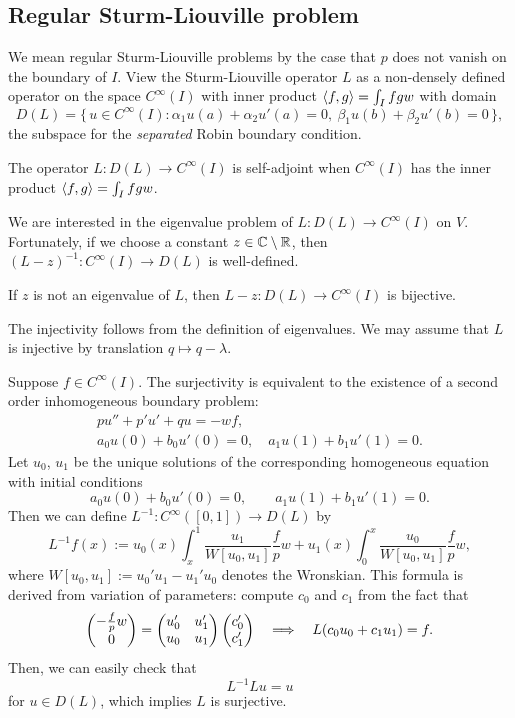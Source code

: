 \documentclass[11pt]{article}
\begin{document}
\subsection{Regular Sturm-Liouville problem}
We mean regular Sturm-Liouville problems by the case that $p$ does not vanish on the boundary of $I$.
View the Sturm-Liouville operator $L$ as a non-densely defined operator on the space $C^\infty(I)$ with inner product $\langle f,g\rangle=\int_Ifgw$ with domain
\[D(L)=\{\,u\in C^\infty(I):\alpha_1u(a)+\alpha_2u'(a)=0,\ \beta_1u(b)+\beta_2u'(b)=0\,\},\]
the subspace for the \emph{separated} Robin boundary condition.
\begin{prop}
The operator $L:D(L)\to C^\infty(I)$ is self-adjoint when $C^\infty(I)$ has the inner product $\langle f,g\rangle=\int_Ifgw$.
\end{prop}
We are interested in the eigenvalue problem of $L:D(L)\to C^\infty(I)$ on $V$.
Fortunately, if we choose a constant $z\in\mathbb{C}\setminus\mathbb{R}$, then $(L-z)^{-1}:C^\infty(I)\to D(L)$ is well-defined.
\begin{prop}
If $z$ is not an eigenvalue of $L$, then $L-z: D(L)\to C^\infty(I)$ is bijective.
\end{prop}
\begin{pf}
The injectivity follows from the definition of eigenvalues.
We may assume that $L$ is injective by translation $q\mapsto q-\lambda$.

Suppose $f\in C^\infty(I)$.
The surjectivity is equivalent to the existence of a second order inhomogeneous boundary problem:
\begin{gather*}
pu''+p'u'+qu=-wf,\\
a_0u(0)+b_0u'(0)=0,\quad a_1u(1)+b_1u'(1)=0.
\end{gather*}
Let $u_0$, $u_1$ be the unique solutions of the corresponding homogeneous equation with initial conditions
\[a_0u(0)+b_0u'(0)=0,\qquad a_1u(1)+b_1u'(1)=0.\]
Then we can define $L^{-1}:C^\infty([0,1])\to D(L)$ by
\[L^{-1}f(x):=u_0(x)\int_x^1\frac{u_1}{W[u_0,u_1]}\frac fpw+u_1(x)\int_0^x\frac{u_0}{W[u_0,u_1]}\frac fpw,\]
where $W[u_0,u_1]:=u_0'u_1-u_1'u_0$ denotes the Wronskian.
This formula is derived from variation of parameters: compute $c_0$ and $c_1$ from the fact that
\[\begin{pmatrix}-\frac fpw\\0\end{pmatrix}=\begin{pmatrix}u_0'&u_1'\\u_0&u_1\end{pmatrix}\begin{pmatrix}c_0'\\c_1'\end{pmatrix}\impl L(c_0u_0+c_1u_1)=f.\]
Then, we can easily check that
\[L^{-1}Lu=u\]
for $u\in D(L)$, which implies $L$ is surjective.
\end{pf}
\end{document}
